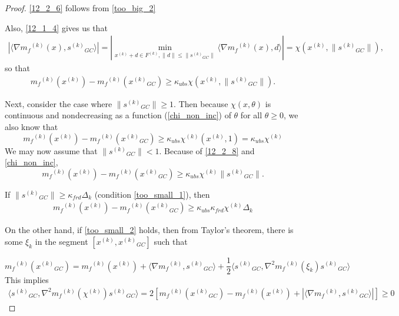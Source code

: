 \documentclass{article}
\theoremstyle{case}
\newcommand{\modelk}{{{m}_f}^{(k)}}
\newcommand{\gradmodelk}{\nabla{{m}_f}^{(k)}}
\newcommand{\iteratek}{{x}^{(k)}}
\newcommand{\feasiblek}{{F}^{(k)}}
\newcommand{\gck}{{{x}^{(k)}}_{GC}}
\newcommand{\sgck}{{{s}^{(k)}}_{GC}}
\newcommand{\chik}{{\chi^{(k)}}}
\begin{document}
\begin{proof}
\ref{12_2_6} follows from \ref{too_big_2}

Also, \ref{12_1_4} gives us that
\begin{align}
|\langle \nabla \modelk(x), \sgck \rangle| =  | \min_{\iteratek+d \in \feasiblek, \|d\| \le \|\sgck\|}\langle \gradmodelk(x), d\rangle| = \chi(\iteratek, \|\sgck\|),
\end{align}
so that
\begin{align}
\label{12_2_8}
\modelk(\iteratek) - \modelk(\gck) \ge \kappa_{ubs}\chi(\iteratek, \|\sgck\|).
\end{align}

Next, consider the case where $\|\sgck\| \ge 1$.
Then because $\chi(x, \theta)$ is continuous and nondecreasing as a function (\ref{chi_non_inc}) of $\theta$ for all $\theta \ge 0$,
we also know that
\[
\modelk(\iteratek)-\modelk(\gck) \ge \kappa_{ubs}\chik(\iteratek, 1) = \kappa_{ubs}\chik
\]
We may now assume that $\|\sgck\| < 1$.
Because of \ref{12_2_8} and \ref{chi_non_inc}, 
\[
\modelk(\iteratek) - \modelk(\gck) \ge \kappa_{ubs}\chik\|\sgck\|.
\]

If $\|\sgck\| \ge \kappa_{frd}\Delta_k$ (condition \ref{too_small_1}), then
\begin{align}
\modelk(\iteratek) - \modelk(\gck) \ge \kappa_{ubs}\kappa_{frd}\chik \Delta_k
\end{align}

On the other hand, if \ref{too_small_2} holds, then from Taylor's theorem, there is some $\xi_k$ in the segment $[\iteratek, \gck]$ such that

\[
\modelk(\gck) = \modelk(\iteratek)  + \langle \gradmodelk, \sgck \rangle + \frac 1 2 \langle \sgck, \nabla^2\modelk(\xi_k)\sgck\rangle
\]
This implies
\begin{align}
\langle \sgck, \nabla^2 \modelk(\chik)\sgck \rangle = 2 [\modelk(\gck) - \modelk(\iteratek) + |\langle \gradmodelk, \sgck\rangle|] \ge 0
\end{align}


\end{proof}
\end{document}
